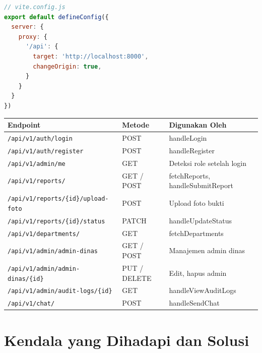 \documentclass[12pt,a4paper]{article}
\begin{document}
\begin{lstlisting}[language=JavaScript, caption=Vite proxy config untuk API]
// vite.config.js
export default defineConfig({
  server: {
    proxy: {
      '/api': {
        target: 'http://localhost:8000',
        changeOrigin: true,
      }
    }
  }
})
\end{lstlisting}

\begin{center}
\begin{longtable}{p{3cm}p{3cm}p{6cm}}
  \toprule
  \textbf{Endpoint} & \textbf{Metode} & \textbf{Digunakan Oleh} \\
  \midrule
  \texttt{/api/v1/auth/login} & POST & handleLogin \\
  \texttt{/api/v1/auth/register} & POST & handleRegister \\
  \texttt{/api/v1/admin/me} & GET & Deteksi role setelah login \\
  \texttt{/api/v1/reports/} & GET / POST & fetchReports, handleSubmitReport \\
  \texttt{/api/v1/reports/\{id\}/upload-foto} & POST & Upload foto bukti \\
  \texttt{/api/v1/reports/\{id\}/status} & PATCH & handleUpdateStatus \\
  \texttt{/api/v1/departments/} & GET & fetchDepartments \\
  \texttt{/api/v1/admin/admin-dinas} & GET / POST & Manajemen admin dinas \\
  \texttt{/api/v1/admin/admin-dinas/\{id\}} & PUT / DELETE & Edit, hapus admin \\
  \texttt{/api/v1/admin/audit-logs/\{id\}} & GET & handleViewAuditLogs \\
  \texttt{/api/v1/chat/} & POST & handleSendChat \\
  \bottomrule
\end{longtable}
\end{center}

\section{Kendala yang Dihadapi dan Solusi}
\end{document}
